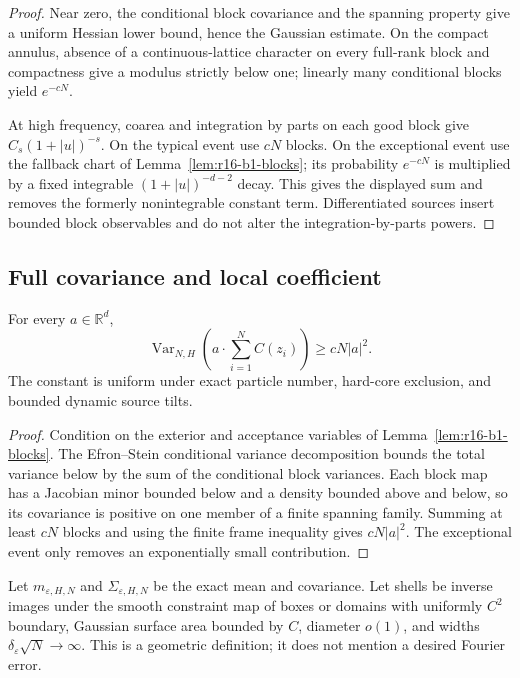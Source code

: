 \begin{proof}
Near zero, the conditional block covariance and the spanning property give a
uniform Hessian lower bound, hence the Gaussian estimate.  On the compact
annulus, absence of a continuous-lattice character on every full-rank block
and compactness give a modulus strictly below one; linearly many conditional
blocks yield \(e^{-cN}\).

At high frequency, coarea and integration by parts on each good block give
\(C_s(1+|u|)^{-s}\).  On the typical event use \(cN\) blocks.  On the
exceptional event use the fallback chart of
Lemma~\ref{lem:r16-b1-blocks}; its probability \(e^{-cN}\) is multiplied by a
fixed integrable \((1+|u|)^{-d-2}\) decay.  This gives the displayed sum and
removes the formerly nonintegrable constant term.  Differentiated sources
insert bounded block observables and do not alter the integration-by-parts
powers.
\end{proof}

\subsection{Full covariance and local coefficient}

\begin{lemma}
\label{lem:r16-b1-covariance}
For every \(a\in\mathbb R^d\),
\[
 \operatorname{Var}_{N,H}
 \left(a\cdot\sum_{i=1}^NC(z_i)\right)
 \ge cN|a|^2.
\]
The constant is uniform under exact particle number, hard-core exclusion, and
bounded dynamic source tilts.
\end{lemma}

\begin{proof}
Condition on the exterior and acceptance variables of
Lemma~\ref{lem:r16-b1-blocks}.  The Efron--Stein conditional variance
decomposition bounds the total variance below by the sum of the conditional
block variances.  Each block map has a Jacobian minor bounded below and a
density bounded above and below, so its covariance is positive on one member
of a finite spanning family.  Summing at least \(cN\) blocks and using the
finite frame inequality gives \(cN|a|^2\).  The exceptional event only removes
an exponentially small contribution.
\end{proof}

Let \(m_{\varepsilon,H,N}\) and \(\Sigma_{\varepsilon,H,N}\) be the exact
mean and covariance.  Let shells be inverse images under the smooth constraint
map of boxes or domains with uniformly \(C^2\) boundary, Gaussian surface area
bounded by \(C\), diameter \(o(1)\), and widths
\(\delta_\varepsilon\sqrt N\to\infty\).  This is a geometric definition; it
does not mention a desired Fourier error.

